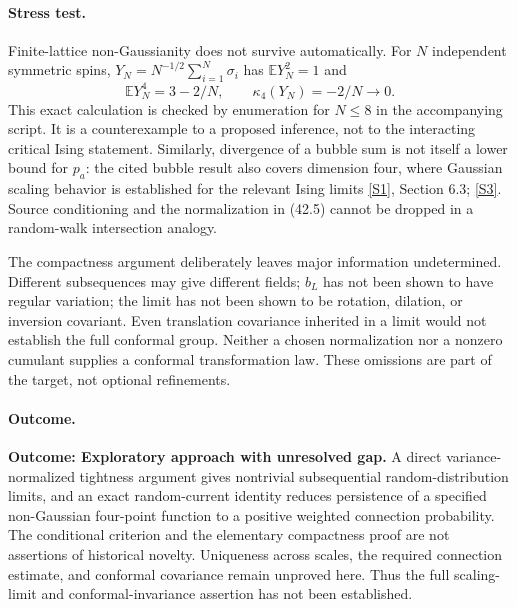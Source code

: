 \documentclass[11pt,a4paper]{article}
\newcommand{\E}{\mathbb{E}}
\newcommand{\sref}[2]{\hyperlink{source:#1:#2}{[S#2]}}
\numberwithin{equation}{section}
\begin{document}
\paragraph{Stress test.}
Finite-lattice non-Gaussianity does not survive automatically. For $N$
independent symmetric spins, $Y_N=N^{-1/2}\sum_{i=1}^N\sigma_i$ has
$\E Y_N^2=1$ and
\[
 \E Y_N^4=3-2/N,\qquad \kappa_4(Y_N)=-2/N\longrightarrow0.
\]
This exact calculation is checked by enumeration for $N\le8$ in the
accompanying script. It is a counterexample to a proposed inference, not
to the interacting critical Ising statement. Similarly, divergence of a
bubble sum is not itself a lower bound for $p_a$: the cited bubble result
also covers dimension four, where Gaussian scaling behavior is established
for the relevant Ising limits \sref{statement}{1}, Section 6.3; \sref{statement}{3}.
Source conditioning and the normalization in (42.5) cannot be dropped in a
random-walk intersection analogy.

The compactness argument deliberately leaves major information undetermined.
Different subsequences may give different fields; $b_L$ has not been shown
to have regular variation; the limit has not been shown to be rotation,
dilation, or inversion covariant. Even translation covariance inherited in
a limit would not establish the full conformal group. Neither a chosen
normalization nor a nonzero cumulant supplies a conformal transformation
law. These omissions are part of the target, not optional refinements.

\paragraph{Outcome.}
\textbf{Outcome: Exploratory approach with unresolved gap.}
A direct variance-normalized tightness argument gives nontrivial
subsequential random-distribution limits, and an exact random-current
identity reduces persistence of a specified non-Gaussian four-point
function to a positive weighted connection probability. The conditional
criterion and the elementary compactness proof are not assertions of
historical novelty. Uniqueness across scales, the required connection
estimate, and conformal covariance remain unproved here. Thus the full
scaling-limit and conformal-invariance assertion has not been established.
\end{document}

